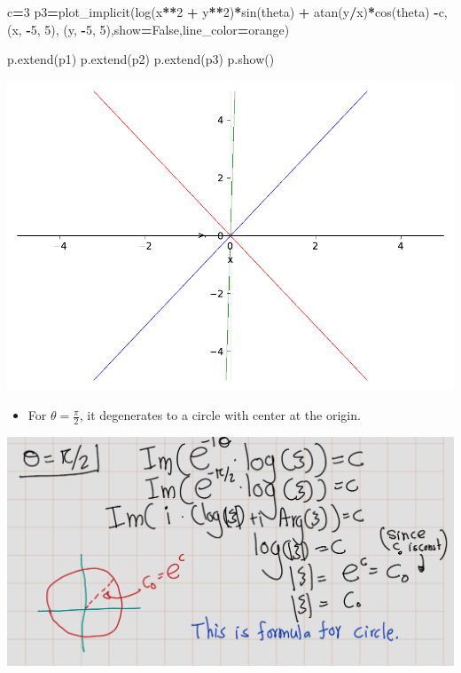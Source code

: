 \documentclass[
]{book}
\newenvironment{Shaded}{\begin{snugshade}}{\end{snugshade}}
\newcommand{\DecValTok}[1]{\textcolor[rgb]{0.00,0.00,0.81}{#1}}
\newcommand{\NormalTok}[1]{#1}
\newcommand{\OperatorTok}[1]{\textcolor[rgb]{0.81,0.36,0.00}{\textbf{#1}}}
\newcommand{\StringTok}[1]{\textcolor[rgb]{0.31,0.60,0.02}{#1}}
\newcommand{\VariableTok}[1]{\textcolor[rgb]{0.00,0.00,0.00}{#1}}
\providecommand{\tightlist}{%
  \setlength{\itemsep}{0pt}\setlength{\parskip}{0pt}}
\theoremstyle{definition}
\theoremstyle{definition}
\theoremstyle{definition}
\theoremstyle{definition}
\theoremstyle{remark}
\begin{document}
\begin{Shaded}
\begin{Highlighting}[]
\NormalTok{c}\OperatorTok{=}\DecValTok{3}
\NormalTok{p3}\OperatorTok{=}\NormalTok{plot\_implicit(log(x}\OperatorTok{**}\DecValTok{2} \OperatorTok{+}\NormalTok{ y}\OperatorTok{**}\DecValTok{2}\NormalTok{)}\OperatorTok{*}\NormalTok{sin(theta) }\OperatorTok{+}\NormalTok{ atan(y}\OperatorTok{/}\NormalTok{x)}\OperatorTok{*}\NormalTok{cos(theta) }\OperatorTok{{-}}\NormalTok{c,(x, }\OperatorTok{{-}}\DecValTok{5}\NormalTok{, }\DecValTok{5}\NormalTok{), (y, }\OperatorTok{{-}}\DecValTok{5}\NormalTok{, }\DecValTok{5}\NormalTok{),show}\OperatorTok{=}\VariableTok{False}\NormalTok{,line\_color}\OperatorTok{=}\StringTok{\textquotesingle{}orange\textquotesingle{}}\NormalTok{)}


\NormalTok{p.extend(p1)}
\NormalTok{p.extend(p2)}
\NormalTok{p.extend(p3)}
\NormalTok{p.show()}
\end{Highlighting}
\end{Shaded}

\includegraphics{ConformalMapping_files/figure-latex/unnamed-chunk-67-1.pdf}

\begin{itemize}
\tightlist
\item
  For \(\theta = \frac{\pi}{2}\), it degenerates to a circle with center at the origin.
\end{itemize}

\includegraphics[width=20.99in]{figures/Helical_Domain/fig3}
\end{document}
